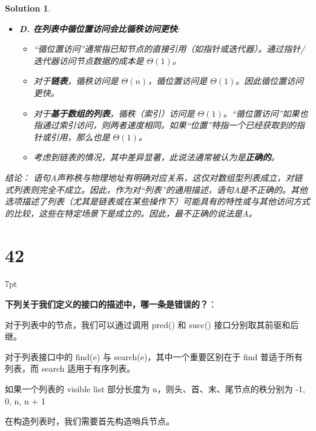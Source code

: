 \documentclass[UTF8]{report}
\newtheorem{solution}{Solution}
\theoremstyle{MyLineTheoremStyle} %
\theoremstyle{MyBlockTheoremStyle} %
\theoremstyle{MySubsubsectionStyle} %
\newenvironment{graybox}{%
        \def\FrameCommand{%
        \hspace{1pt}%
        {\color{gray}\small \vrule width 2pt}%
        {\color{graybox_color}\vrule width 4pt}%
        \colorbox{graybox_color}%
        }%
        \MakeFramed{\advance\hsize-\width\FrameRestore}%
        \noindent\hspace{-4.55pt}%
        \begin{adjustwidth}{}{7pt}%
        \vspace{2pt}\vspace{2pt}%
        }
        {%
        \vspace{2pt}\end{adjustwidth}\endMakeFramed%
        }
\begin{document}
\begin{solution}
\begin{itemize}
    \item \textbf{D. 在列表中循位置访问会比循秩访问更快}:
    \begin{itemize}
        \item “循位置访问”通常指已知节点的直接引用（如指针或迭代器）。通过指针/迭代器访问节点数据的成本是 $\Theta(1)$。
        \item 对于\textbf{链表}，循秩访问是 $\Theta(n)$，循位置访问是 $\Theta(1)$。因此循位置访问更快。
        \item 对于\textbf{基于数组的列表}，循秩（索引）访问是 $\Theta(1)$。“循位置访问”如果也指通过索引访问，则两者速度相同。如果“位置”特指一个已经获取到的指针或引用，那么也是 $\Theta(1)$。
        \item 考虑到链表的情况，其中差异显著，此说法通常被认为是\textbf{正确的}。
    \end{itemize}
\end{itemize}
结论：
语句A声称秩与物理地址有明确对应关系，这仅对数组型列表成立，对链式列表则完全不成立。因此，作为对“列表”的通用描述，语句A是不正确的。其他选项描述了列表（尤其是链表或在某些操作下）可能具有的特性或与其他访问方式的比较，这些在特定场景下是成立的。因此，最不正确的说法是A。
\end{solution}


\section*{42}

\begin{graybox}
\textbf{下列关于我们定义的接口的描述中，哪一条是错误的？}：
\begin{circledenum}
    \item 对于列表中的节点，我们可以通过调用 pred() 和 succ() 接口分别取其前驱和后继。
    \item 对于列表接口中的 find(e) 与 search(e)，其中一个重要区别在于 find 普适于所有列表，而 search 适用于有序列表。
    \item 如果一个列表的 visible list 部分长度为 n，则头、首、末、尾节点的秩分别为 -1, 0, n, n + 1
    \item 在构造列表时，我们需要首先构造哨兵节点。
\end{circledenum}
\end{graybox}
\end{document}
